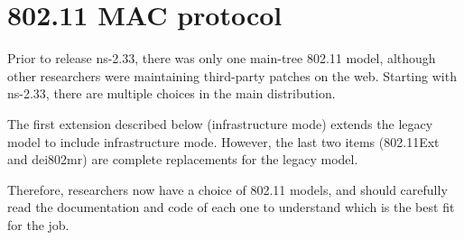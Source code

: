\section{802.11 MAC protocol}
\label{sec:802_11}
Prior to release ns-2.33, there was only one main-tree 802.11 model,
although other researchers were maintaining third-party patches
on the web.  Starting with ns-2.33, there are multiple choices in
the main distribution.

The first extension described below (infrastructure mode) extends
the legacy model to include infrastructure mode.  However, the last
two items (802.11Ext and dei802mr) are complete replacements for the
legacy model.

Therefore, researchers now have a choice of 802.11 models, and
should carefully read the documentation and code of each one to
understand which is the best fit for the job. 

